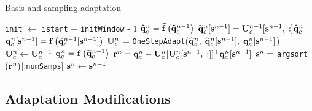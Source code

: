 \begin{algorithm}
    \caption{Basis and sampling adaptation}\label{alg:adapt}
    \begin{algorithmic}

    \STATE \texttt{init} $\leftarrow$ \texttt{istart} + \texttt{initWindow} - 1
        \STATE $\mathbf{\widehat{q}}_{c}^{n} = \mathbf{\widetilde{f}}\left(\mathbf{\widehat{q}}_{c}^{n-1}\right)$
        \STATE $\consVecRom^{\timeIdx}[\sampVec^{\timeIdx-1}] = \consTrial^{\timeIdx-1}[\sampVec^{\timeIdx-1}, \; :] \consVecCoef^{\timeIdx}$
            \STATE $\mathbf{q}_{c}^{n}[\mathbf{s}^{n-1}] = \mathbf{f} \left(\mathbf{\widetilde{q}}_{c}^{n - 1}[\mathbf{s}^{n-1}]\right)$
            \STATE $\consTrial^{\timeIdx}$ = \texttt{OneStepAdapt}($\mathbf{\widehat{q}}_{c}^{n}, \; \mathbf{\widetilde{q}}_{c}^{n}[\mathbf{s}^{n-1}], \; \mathbf{q}_{c}^{n}[\mathbf{s}^{n-1}]$)
        \ELSE
            \STATE $\consTrial^{\timeIdx} \leftarrow \consTrial^{\timeIdx - 1}$
        \ENDIF
            \STATE $\mathbf{q}_{c}^{n} = \mathbf{f} \left(\mathbf{\widetilde{q}}_{c}^{n-1}\right)$
            \STATE $\resVec^{\timeIdx} = \consVec^{\timeIdx} - \consTrial^{\timeIdx} [\consTrial^{\timeIdx}[\sampVec^{\timeIdx-1}, \; :]]^+ \consVec^{\timeIdx}[\sampVec^{\timeIdx - 1}]$
            \STATE $\mathbf{s}^{n} = $ \texttt{argsort}$(\mathbf{r}^{n})$[:\texttt{numSamps}]
        \ELSE
            \STATE $\mathbf{s}^{n} \leftarrow \mathbf{s}^{n-1}$
        \ENDIF
    \ENDFOR

    \end{algorithmic}
\end{algorithm}

\subsection{Adaptation Modifications}